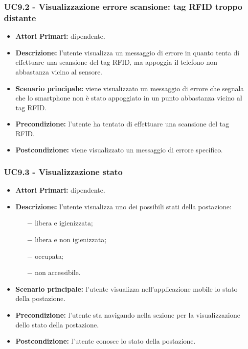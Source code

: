 \subsubsection{ UC9.2 - Visualizzazione errore scansione: tag RFID troppo distante}
\begin{itemize}
	\item\textbf{Attori Primari:} dipendente.
	\item\textbf{Descrizione:} l’utente visualizza un messaggio di errore in quanto tenta di effettuare una scansione del tag RFID, ma appoggia il telefono non abbastanza vicino al sensore.
	\item\textbf{Scenario principale:} viene visualizzato un messaggio di errore che segnala che lo smartphone non è stato appoggiato in un punto abbastanza vicino
	al tag RFID.
	\item\textbf{Precondizione:} l’utente ha tentato di effettuare una scansione del tag RFID.
	\item\textbf{Postcondizione:} viene visualizzato un messaggio di errore specifico.
\end{itemize}
\subsubsection{ UC9.3 - Visualizzazione stato}
\begin{itemize}
	\item\textbf{Attori Primari:} dipendente.
	\item\textbf{Descrizione:} l’utente visualizza uno dei possibili stati della postazione:
	\begin{itemize}
	\item[$-$]libera e igienizzata;
	\item[$-$]libera e non igienizzata;
	\item[$-$]occupata;
	\item[$-$]non accessibile.
    \end{itemize}
	\item\textbf{Scenario principale:} l’utente visualizza nell'applicazione mobile lo stato della postazione.
	\item\textbf{Precondizione:} l’utente sta navigando nella sezione per la visualizzazione dello stato della postazione.
	\item\textbf{Postcondizione:} l’utente conosce lo stato della postazione.
\end{itemize}

